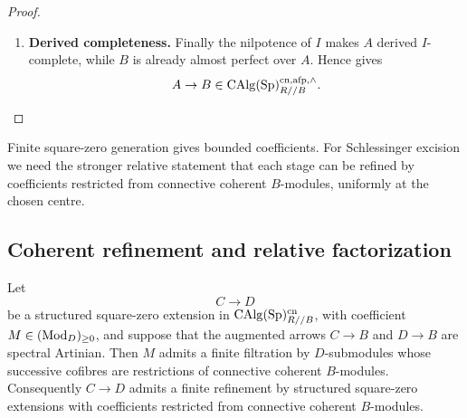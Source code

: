 \begin{proof}
\begin{enumerate}[label=\textup{(\arabic*)}]
    \(A_{j-1}\) is coherent and \(B\) is almost perfect over \(A_{j-1}\). The
    coefficient of \(A_j\to A_{j-1}\) is the restriction of a connective coherent
    \(B\)-module, hence is almost perfect over \(A_{j-1}\). Applying
     with centre \(A_{j-1}\) proves that
    \(A_j\) is coherent and that \(A_{j-1}\) is almost perfect over \(A_j\).
     then makes \(B\) almost
    perfect over \(A_j\). Induction reaches
    \(A_m=A\) and proves that \(A\) is coherent.
    \item \textbf{Derived completeness.}
    Finally the nilpotence of \(I\) makes \(A\) derived \(I\)-complete, while
    \(B\) is already almost perfect over \(A\). Hence
     gives
    \[
        A\to B\in\operatorname{CAlg}(\operatorname{Sp})^{\mathrm{cn},\mathrm{afp},\wedge}_{R//B}.
    \]
\end{enumerate}
\end{proof}

Finite square-zero generation gives bounded coefficients. For Schlessinger excision we
need the stronger relative statement that each stage can be refined by coefficients
restricted from connective coherent \(B\)-modules, uniformly at the chosen centre.

\subsection{Coherent refinement and relative factorization}

\begin{lemma}
\label{lem:artinian-square-zero-coherent-refinement}
Let
\[
    C\longrightarrow D
\]
be a structured square-zero extension in
\(\operatorname{CAlg}(\operatorname{Sp})^{\mathrm{cn}}_{R//B}\), with coefficient
\(M\in(\operatorname{Mod}_D)_{\geq0}\), and suppose that the augmented arrows
\(C\to B\) and \(D\to B\) are spectral Artinian. Then \(M\) admits a
finite filtration by \(D\)-submodules whose successive cofibres are
restrictions of connective coherent \(B\)-modules. Consequently \(C\to D\) admits a finite refinement by structured square-zero extensions with coefficients
restricted from connective coherent \(B\)-modules.
\end{lemma}

